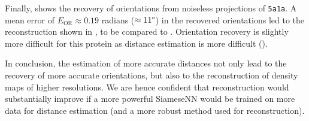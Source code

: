 Finally,  shows the recovery of orientations from noiseless projections of \texttt{5a1a}.
A mean error of $E_\text{OR} \approx 0.19$ radians ($\approx 11\degree$) in the recovered orientations led to the reconstruction shown in , to be compared to .
Orientation recovery is slightly more difficult for this protein as distance estimation is more difficult ().

In conclusion, the estimation of more accurate distances not only lead to the recovery of more accurate orientations, but also to the reconstruction of density maps of higher resolutions.
We are hence confident that reconstruction would substantially improve if a more powerful SiameseNN would be trained on more data for distance estimation (and a more robust method used for reconstruction).
